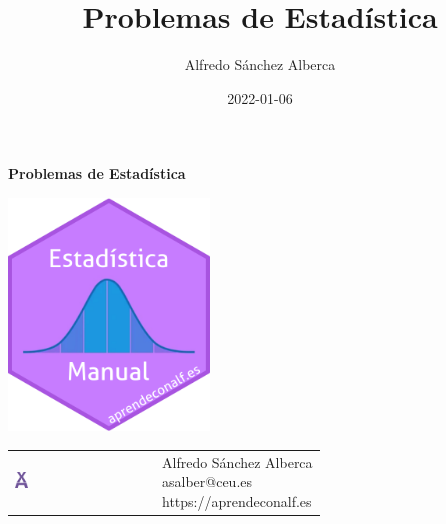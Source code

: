 \documentclass[
  a4paper,
]{scrreport}
\title{Problemas de Estadística}
\author{Alfredo Sánchez Alberca}
\date{2022-01-06}
\renewcommand*\contentsname{Tabla de contenidos}
\newcommand\contentsname{Tabla de contenidos}
\theoremstyle{definition}
\theoremstyle{remark}
\begin{document}
\begin{titlepage}

\begin{center}
\vspace*{5cm}

\Huge
{\textbf{\textsf{Problemas de Estadística}}}

\vspace{0.5cm}
\LARGE
{\textbf{\textsf{}}}

\vspace{1.5cm}

\includegraphics[width=0.4\textwidth]{img/logos/sticker.png}
\end{center}

\vfill

\begin{flushleft}
\begin{tabular}{ll}
\includegraphics[width=0.1\textwidth]{img/logos/aprendeconalf.png} & \parbox[b]{5cm}{\Large\textsf{Alfredo
Sánchez
Alberca}\\ \textsf{asalber@ceu.es} \\ \textsf{https://aprendeconalf.es}}
\end{tabular}
\end{flushleft}
\end{titlepage}\ifdefined\Shaded\renewenvironment{Shaded}{\begin{tcolorbox}[breakable, sharp corners, enhanced, interior hidden, boxrule=0pt, borderline west={3pt}{0pt}{shadecolor}, frame hidden]}{\end{tcolorbox}}\fi

\renewcommand*\contentsname{Tabla de contenidos}
{
\hypersetup{linkcolor=}
\setcounter{tocdepth}{2}
\tableofcontents
}
\end{document}

